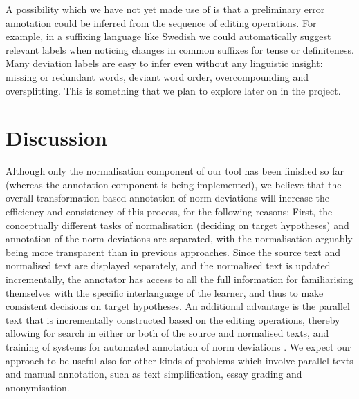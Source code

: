 \documentclass[10pt, a4paper]{article}
\newcommand{\dan}[1]{{\color{Fuchsia}{Dan: #1}}}
\newcommand{\elena}[1]{{\color{BrickRed}{Elena: #1}}}
\newcommand{\normAnn}[0]{our tool }
\begin{document}
A possibility which we have not yet made use of is that a preliminary error annotation could be inferred from the sequence of editing operations. For example, in a suffixing language like Swedish we could automatically
suggest relevant labels when noticing changes in common suffixes for tense
or definiteness.
Many deviation labels are easy to infer even without any linguistic
insight: missing or redundant words, deviant word order, overcompounding
and oversplitting.
This is something that we plan to explore later on in the project.


\section{Discussion}
\label{sec:discussion}


Although only the normalisation component of \normAnn has been finished so far (whereas the annotation component is being implemented), we believe that the overall transformation-based annotation of norm deviations
will increase the efficiency and consistency of this process, for the following reasons: %
First, the conceptually different tasks of normalisation (deciding on target hypotheses) and annotation of the norm deviations are separated, with the normalisation arguably being more transparent than in previous approaches. Since the source text and normalised text are displayed separately, and the normalised text is updated incrementally, the annotator has access to all the full information for familiarising themselves with the specific interlanguage of the learner, and thus to make consistent decisions on target hypotheses.
An additional advantage is the parallel text that is incrementally constructed based on the editing operations, thereby allowing for search in either or both of the source and normalised texts, and training of systems for automated annotation of norm deviations \cite{sproat2016rnn}.
We expect our approach to be useful also for other kinds of problems which involve parallel texts and manual annotation, such as text simplification, %
 essay grading and anonymisation. %
\end{document}
